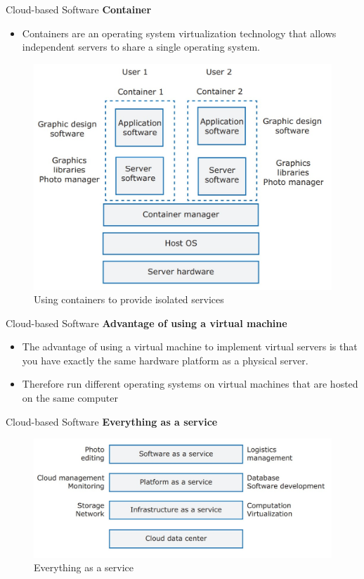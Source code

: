 \documentclass{beamer}
\begin{document}
\begin{frame}{Cloud-based Software}
	\textbf{Container}
	\begin{itemize}
		\item Containers are an operating system virtualization technology that allows 
		independent servers to share a single operating system.
			\end{itemize}	
	\begin{figure}
		\includegraphics[scale=.35]{img/m5_7}
		\caption{Using containers to provide isolated services}
	\end{figure}
\end{frame}
\begin{frame}{Cloud-based Software}
\textbf{Advantage of using a virtual machine}
	\begin{itemize}
		\item The advantage of using a virtual machine to implement virtual servers is that you have exactly the same hardware platform as a physical server. 
		\item Therefore run different operating systems on virtual machines that are hosted on the same computer
	\end{itemize}		
	
\end{frame}
\begin{frame}{Cloud-based Software}
	\textbf{Everything as a service}
	\begin{figure}
	\includegraphics[scale=.5]{img/m5_8}
	\caption{Everything as a service}
\end{figure}
\end{frame}
\end{document}
